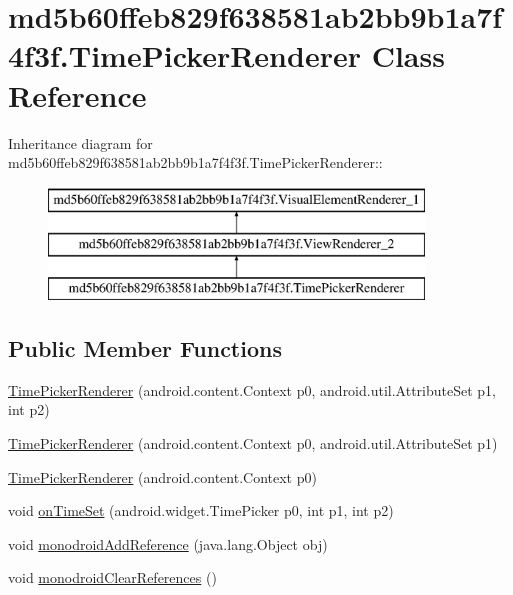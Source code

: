 \hypertarget{classmd5b60ffeb829f638581ab2bb9b1a7f4f3f_1_1_time_picker_renderer}{
\section{md5b60ffeb829f638581ab2bb9b1a7f4f3f.TimePickerRenderer Class Reference}
\label{classmd5b60ffeb829f638581ab2bb9b1a7f4f3f_1_1_time_picker_renderer}
}
Inheritance diagram for md5b60ffeb829f638581ab2bb9b1a7f4f3f.TimePickerRenderer::\begin{figure}[H]
\begin{center}
\leavevmode
\includegraphics[height=3cm]{classmd5b60ffeb829f638581ab2bb9b1a7f4f3f_1_1_time_picker_renderer}
\end{center}
\end{figure}
\subsection*{Public Member Functions}
\begin{CompactItemize}
\item 
\hyperlink{classmd5b60ffeb829f638581ab2bb9b1a7f4f3f_1_1_time_picker_renderer_ea08e098874d7b721d4936ff36f29e0e}{TimePickerRenderer} (android.content.Context p0, android.util.AttributeSet p1, int p2)
\item 
\hyperlink{classmd5b60ffeb829f638581ab2bb9b1a7f4f3f_1_1_time_picker_renderer_66248b9a92ae22c9d0929971dabb0092}{TimePickerRenderer} (android.content.Context p0, android.util.AttributeSet p1)
\item 
\hyperlink{classmd5b60ffeb829f638581ab2bb9b1a7f4f3f_1_1_time_picker_renderer_88438e043108dffa9cb1d613995b7aa1}{TimePickerRenderer} (android.content.Context p0)
\item 
void \hyperlink{classmd5b60ffeb829f638581ab2bb9b1a7f4f3f_1_1_time_picker_renderer_c2ef26492e19e4ba5a31033d11ae8a6a}{onTimeSet} (android.widget.TimePicker p0, int p1, int p2)
\item 
void \hyperlink{classmd5b60ffeb829f638581ab2bb9b1a7f4f3f_1_1_time_picker_renderer_09ae55d639cff012f899b5f0d3854c43}{monodroidAddReference} (java.lang.Object obj)
\item 
void \hyperlink{classmd5b60ffeb829f638581ab2bb9b1a7f4f3f_1_1_time_picker_renderer_dc6b30a3a46eab5938559e8d3c3674c2}{monodroidClearReferences} ()
\end{CompactItemize}
